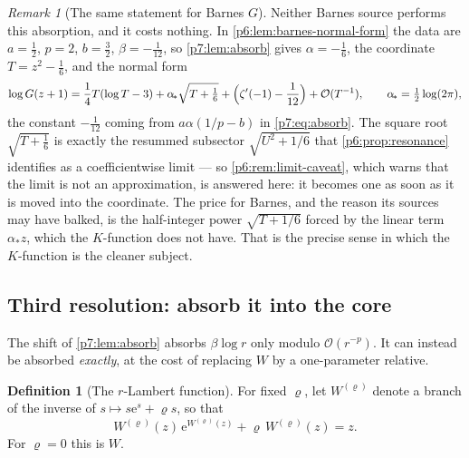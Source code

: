 \documentclass[11pt,a4paper,oneside]{book}
\theoremstyle{plain}
\theoremstyle{definition}
\newtheorem{definition}[theorem]{Definition}
\theoremstyle{remark}
\newtheorem{remark}[theorem]{Remark}
\newcommand{\e}{\mathrm{e}}
\newcommand{\bigO}{\mathcal{O}}
\newcommand{\Wlam}{W}
\begin{document}
\begin{remark}[The same statement for Barnes $G$]\label{p7:rem:barnes-too}
Neither Barnes source performs this absorption, and it costs nothing.  In
\cref{p6:lem:barnes-normal-form} the data are $a=\tfrac12$, $p=2$,
$b=\tfrac32$, $\beta=-\tfrac1{12}$, so \cref{p7:lem:absorb} gives
$\alpha=-\tfrac16$, the coordinate $T=z^{2}-\tfrac16$, and the normal form
\begin{equation}\label{p7:eq:barnes-accelerated}
 \log G(z+1)
 =\frac14T(\log T-3)+\alpha_{\!*}\sqrt{T+\tfrac16}
 +\Bigl(\zeta'(-1)-\frac1{12}\Bigr)+\bigO(T^{-1}),
 \qquad \alpha_{\!*}=\tfrac12\log(2\pi),
\end{equation}
the constant $-\tfrac1{12}$ coming from $a\alpha(1/p-b)$ in
\eqref{p7:eq:absorb}.  The square root $\sqrt{T+\tfrac16}$ is exactly the
resummed subsector $\sqrt{U^{2}+1/6}$ that
\cref{p6:prop:resonance} identifies as a coefficientwise limit --- so
\cref{p6:rem:limit-caveat}, which warns that the limit is not an
approximation, is answered here: it becomes one as soon as it is moved into
the coordinate.  The price for Barnes, and the reason its sources may have
balked, is the half-integer power $\sqrt{T+1/6}$ forced by the linear term
$\alpha_{\!*}z$, which the $K$-function does not have.  That is the precise
sense in which the $K$-function is the cleaner subject.
\end{remark}

\subsection{Third resolution: absorb it into the core}

The shift of \cref{p7:lem:absorb} absorbs $\beta\log r$ only modulo
$\bigO(r^{-p})$.  It can instead be absorbed \emph{exactly}, at the cost of
replacing $\Wlam$ by a one-parameter relative.

\begin{definition}[The $r$-Lambert function]\label{p7:def:rlambert}
For fixed $\varrho$, let $\Wlam^{(\varrho)}$ denote a branch of the inverse of
$s\mapsto s\e^{s}+\varrho s$, so that
\begin{equation}\label{p7:eq:rlambert}
 \Wlam^{(\varrho)}(z)\,\e^{\Wlam^{(\varrho)}(z)}
 +\varrho\,\Wlam^{(\varrho)}(z)=z .
\end{equation}
For $\varrho=0$ this is $\Wlam$.
\end{definition}
\end{document}
